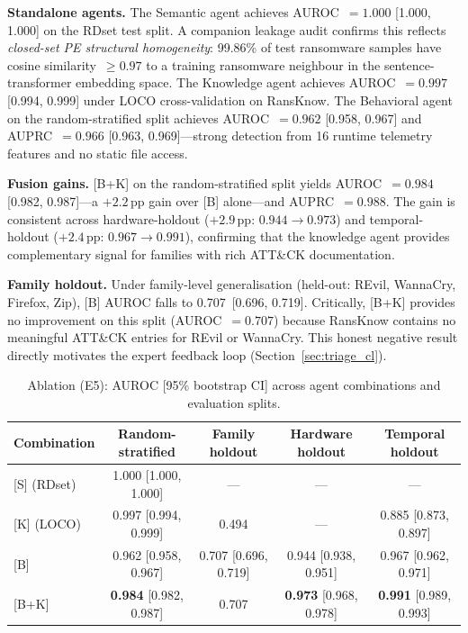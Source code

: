 \documentclass[journal]{IEEEtran}
\begin{document}
\textbf{Standalone agents.}
The Semantic agent achieves AUROC~$= 1.000$ [1.000, 1.000] on the RDset test split.
A companion leakage audit confirms this reflects \emph{closed-set PE structural
homogeneity}: 99.86\% of test ransomware samples have cosine similarity~$\geq 0.97$
to a training ransomware neighbour in the sentence-transformer embedding space.
The Knowledge agent achieves AUROC~$= 0.997$ [0.994, 0.999] under LOCO cross-validation
on RansKnow.
The Behavioral agent on the random-stratified split achieves AUROC~$= 0.962$
[0.958, 0.967] and AUPRC~$= 0.966$ [0.963, 0.969]---strong detection from 16
runtime telemetry features and no static file access.

\textbf{Fusion gains.}
{[}B{+}K{]} on the random-stratified split yields AUROC~$= 0.984$
[0.982, 0.987]---a $+2.2$\,pp gain over {[}B{]} alone---and AUPRC~$= 0.988$.
The gain is consistent across hardware-holdout ($+2.9$\,pp: $0.944 \to 0.973$) and
temporal-holdout ($+2.4$\,pp: $0.967 \to 0.991$), confirming that the knowledge agent
provides complementary signal for families with rich ATT\&CK documentation.

\textbf{Family holdout.}
Under family-level generalisation (held-out: REvil, WannaCry, Firefox, Zip),
{[}B{]} AUROC falls to 0.707~[0.696, 0.719].
Critically, {[}B{+}K{]} provides no improvement on this split (AUROC~$= 0.707$) because
RansKnow contains no meaningful ATT\&CK entries for REvil or WannaCry.
This honest negative result directly motivates the expert feedback loop
(Section~\ref{sec:triage_cl}).

\begin{table}[t]
\centering
\caption{Ablation (E5): AUROC [95\% bootstrap CI] across agent combinations and evaluation splits.}
\label{tab:ablation}
\setlength{\tabcolsep}{4pt}
\begin{tabular}{lcccc}
\toprule
\textbf{Combination} & \textbf{Random-stratified} & \textbf{Family holdout} &
\textbf{Hardware holdout} & \textbf{Temporal holdout} \\
\midrule
{[}S{]} (RDset)  & 1.000 [1.000, 1.000] & ---                   & ---                   & ---                   \\
{[}K{]} (LOCO)   & 0.997 [0.994, 0.999] & 0.494                 & ---                   & 0.885 [0.873, 0.897]  \\
{[}B{]}          & 0.962 [0.958, 0.967] & 0.707 [0.696, 0.719]  & 0.944 [0.938, 0.951]  & 0.967 [0.962, 0.971]  \\
{[}B{+}K{]}      & \textbf{0.984} [0.982, 0.987] & 0.707         & \textbf{0.973} [0.968, 0.978] & \textbf{0.991} [0.989, 0.993] \\
\bottomrule
\end{tabular}
\end{table}
\end{document}
